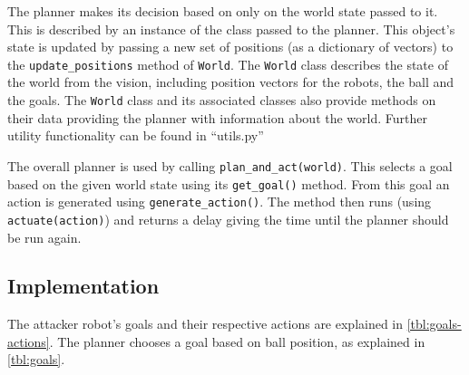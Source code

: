 The planner makes its decision based on only on the world state passed to it. This is described by an instance of the  class passed to the planner. This object's state is updated by passing a new set of positions (as a dictionary of vectors) to the \texttt{update\_positions} method of \texttt{World}. The \texttt{World} class describes the state of the world from the vision, including position vectors for the robots, the ball and the goals. The \texttt{World} class and its associated classes also provide methods on their data providing the planner with information about the world. Further utility functionality can be found in ``utils.py''

The overall planner is used by calling \texttt{plan\_and\_act(world)}.
This selects a goal based on the given world state  using its \texttt{get\_goal()} method. From this goal an action is generated using \texttt{generate\_action()}. The method then runs (using \texttt{actuate(action)}) and returns a delay giving the time until the planner should be run again.

\subsection{Implementation}

The attacker robot's goals and their respective actions are explained in \autoref{tbl:goals-actions}.
The planner chooses a goal based on ball position, as explained in \autoref{tbl:goals}.

